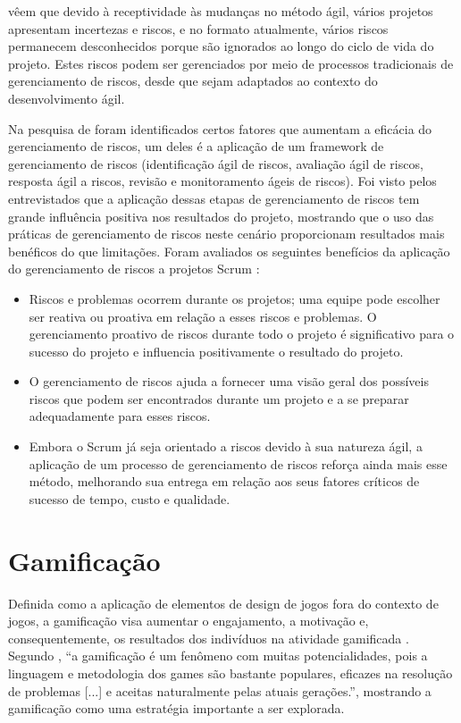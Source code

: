 \documentclass[
	12pt,
	openright,
	twoside,
	a4paper,
	english,
	brazil
	]{abntex2}
\begin{document}
 vêem que devido à receptividade às mudanças no método ágil, vários projetos apresentam incertezas e riscos, e no formato atualmente, vários riscos permanecem desconhecidos porque são ignorados ao longo do ciclo de vida do projeto. Estes riscos podem ser gerenciados por meio de processos tradicionais de gerenciamento de riscos, desde que sejam adaptados ao contexto do desenvolvimento ágil.

Na pesquisa de  foram identificados certos fatores que aumentam a eficácia do gerenciamento de riscos, um deles é a aplicação de um framework de gerenciamento de riscos (identificação ágil de riscos, avaliação ágil de riscos, resposta ágil a riscos, revisão e monitoramento ágeis de riscos). Foi visto pelos entrevistados que a aplicação dessas etapas de gerenciamento de riscos tem grande influência positiva nos resultados do projeto, mostrando que o uso das práticas de gerenciamento de riscos neste cenário proporcionam resultados mais benéficos do que limitações. Foram avaliados os seguintes benefícios da aplicação do gerenciamento de riscos a projetos Scrum \cite{Gold}:
\begin{itemize}
  \item Riscos e problemas ocorrem durante os projetos; uma equipe pode escolher ser reativa ou proativa em relação a esses riscos e problemas. O gerenciamento proativo de riscos durante todo o projeto é significativo para o sucesso do projeto e influencia positivamente o resultado do projeto.
  \item O gerenciamento de riscos ajuda a fornecer uma visão geral dos possíveis riscos que podem ser encontrados durante um projeto e a se preparar adequadamente para esses riscos.
  \item Embora o Scrum já seja orientado a riscos devido à sua natureza ágil, a aplicação de um processo de gerenciamento de riscos reforça ainda mais esse método, melhorando sua entrega em relação aos seus fatores críticos de sucesso de tempo, custo e qualidade.
\end{itemize}


\section{Gamificação}

Definida como a aplicação de elementos de design de jogos fora do contexto de jogos, a gamificação visa aumentar o engajamento, a motivação e, consequentemente, os resultados dos indivíduos na atividade gamificada \cite{GARCIA201721}. Segundo , “a gamificação é um fenômeno com muitas potencialidades, pois a linguagem e metodologia dos games são bastante populares, eficazes na resolução de problemas [...] e aceitas naturalmente pelas atuais gerações.”, mostrando a gamificação como uma estratégia importante a ser explorada.  
\end{document}

